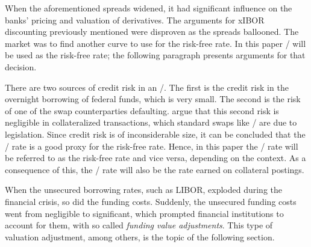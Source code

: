 \documentclass[main.tex]{subfiles}
\begin{document}
    When the aforementioned spreads widened, 
    it had significant influence on the banks' pricing and valuation of derivatives.
    The arguments for xIBOR discounting previously mentioned
    were disproven as the spreads ballooned.
    The market was to find another curve to use for the risk-free rate.
    In this paper \OIS/ will be used as the risk-free rate;
    the following paragraph presents arguments for that decision.

    There are two sources of credit risk in an \OIS/.
    The first is the credit risk in the overnight borrowing of federal funds, which is very small. 
    The second is the risk of one of the swap counterparties defaulting.
    \textcite{HullWhiteOISvsLIBOR}
    argue that this second risk is negligible in collateralized transactions,
    which standard swaps like \OIS/ are due to legislation.
    Since credit risk is of inconsiderable size, it can be concluded 
    that the \OIS/ rate is a good proxy for the risk-free rate.
    Hence, in this paper the \OIS/ rate will be referred to as the risk-free rate
    and vice versa, depending on the context.
    As a consequence of this, the \OIS/ rate will also be the rate earned on collateral postings.

    When the unsecured borrowing rates, such as LIBOR, exploded during the financial crisis, 
    so did the funding costs. 
    Suddenly, the unsecured funding costs went from negligible to significant,
    which prompted financial institutions to account for them, 
    with so called \textit{funding value adjustments}. 
    This type of valuation adjustment, among others, is the topic of the following section.
\end{document}
